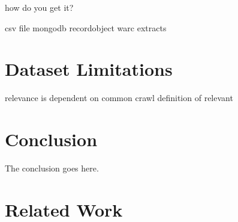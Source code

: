 \documentclass[conference]{IEEEtran}
\begin{document}
how do you get it?

csv file
mongodb recordobject warc extracts




\section{Dataset Limitations}






relevance is dependent on common crawl definition of relevant

\section{Conclusion}
The conclusion goes here.

\section{Related Work}
\end{document}

